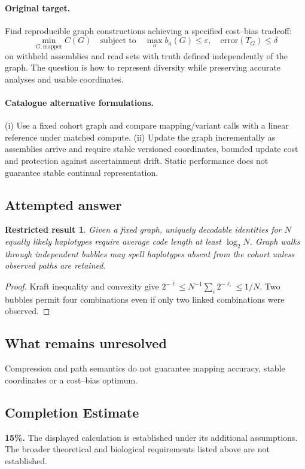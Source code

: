 \documentclass[11pt]{article}
\newtheorem{attemptresult}{Restricted result}[section]
\begin{document}
\paragraph{Original target.}
Find reproducible graph constructions achieving a specified cost--bias tradeoff:
\[
\min_{G,\mathrm{mapper}} C(G)
\quad\text{subject to}\quad\max_a b_a(G)\leq\varepsilon,
\quad \mathrm{error}(T_G)\leq\delta
\]
on withheld assemblies and read sets with truth defined independently of the graph. The question is how to represent diversity while preserving accurate analyses and usable coordinates.
\paragraph{Catalogue alternative formulations.}
(i) Use a fixed cohort graph and compare mapping/variant calls with a linear reference under matched compute. (ii) Update the graph incrementally as assemblies arrive and require stable versioned coordinates, bounded update cost and protection against ascertainment drift. Static performance does not guarantee stable continual representation.
\subsection{Attempted answer}
\begin{attemptresult}
Given a fixed graph, uniquely decodable identities for $N$ equally likely haplotypes require average code length at least $\log_2N$. Graph walks through independent bubbles may spell haplotypes absent from the cohort unless observed paths are retained.
\end{attemptresult}
\begin{proof}
Kraft inequality and convexity give $2^{-\overline\ell}\leq N^{-1}\sum_i2^{-\ell_i}\leq1/N$. Two bubbles permit four combinations even if only two linked combinations were observed.
\end{proof}
\subsection{What remains unresolved}
Compression and path semantics do not guarantee mapping accuracy, stable coordinates or a cost--bias optimum.
\subsection{Completion Estimate}
\textbf{15\%.} The displayed calculation is established under its additional assumptions. The broader theoretical and biological requirements listed above are not established.
\end{document}
